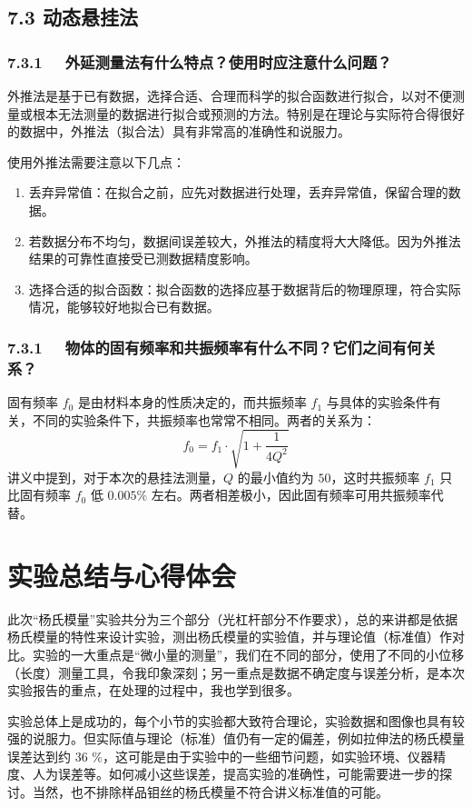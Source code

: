 \documentclass[UTF8]{article}
\theoremstyle{MyLineTheoremStyle} %
\theoremstyle{MyBlockTheoremStyle} %
\theoremstyle{MySubsubsectionStyle} %
\begin{document}
\subsection*{7.3 \quad  动态悬挂法}
\subsubsection*{7.3.1 \ \ 外延测量法有什么特点？使用时应注意什么问题？}
外推法是基于已有数据，选择合适、合理而科学的拟合函数进行拟合，以对不便测量或根本无法测量的数据进行拟合或预测的方法。特别是在理论与实际符合得很好的数据中，外推法（拟合法）具有非常高的准确性和说服力。

使用外推法需要注意以下几点：
\begin{enumerate}
\item 丢弃异常值：在拟合之前，应先对数据进行处理，丢弃异常值，保留合理的数据。
\item 若数据分布不均匀，数据间误差较大，外推法的精度将大大降低。因为外推法结果的可靠性直接受已测数据精度影响。
\item 选择合适的拟合函数：拟合函数的选择应基于数据背后的物理原理，符合实际情况，能够较好地拟合已有数据。
\end{enumerate}

\subsubsection*{7.3.1 \ \ 物体的固有频率和共振频率有什么不同？它们之间有何关系？}
固有频率 $f_0$ 是由材料本身的性质决定的，而共振频率 $f_1$ 与具体的实验条件有关，不同的实验条件下，共振频率也常常不相同。两者的关系为：
\begin{equation}
f_0 = f_1 \cdot \sqrt{ 1 + \frac{1}{4Q^2} }
\end{equation}
讲义中提到，对于本次的悬挂法测量，$Q$ 的最小值约为 $50$，这时共振频率 $f_1$ 只比固有频率 $f_0$ 低 $0.005 \%$ 左右。两者相差极小，因此固有频率可用共振频率代替。

\section{实验总结与心得体会}
此次“杨氏模量”实验共分为三个部分（光杠杆部分不作要求），总的来讲都是依据杨氏模量的特性来设计实验，测出杨氏模量的实验值，并与理论值（标准值）作对比。实验的一大重点是“微小量的测量”，我们在不同的部分，使用了不同的小位移（长度）测量工具，令我印象深刻；另一重点是数据不确定度与误差分析，是本次实验报告的重点，在处理的过程中，我也学到很多。

实验总体上是成功的，每个小节的实验都大致符合理论，实验数据和图像也具有较强的说服力。但实际值与理论（标准）值仍有一定的偏差，例如拉伸法的杨氏模量误差达到约 36 \%，这可能是由于实验中的一些细节问题，如实验环境、仪器精度、人为误差等。如何减小这些误差，提高实验的准确性，可能需要进一步的探讨。当然，也不排除样品钼丝的杨氏模量不符合讲义标准值的可能。
\end{document}
